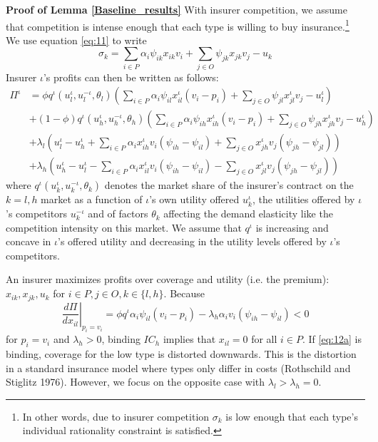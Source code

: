 \documentclass[a4paper,12pt]{article}
\makeatletter
\newcommand{\citeprocitem}[2]{\hyper@linkstart{cite}{citeproc_bib_item_#1}#2\hyper@linkend}
\makeatother
\begin{document}
\textbf{Proof of Lemma \ref{Baseline_results}}
With insurer competition, we assume that competition is intense enough that each type is willing to buy insurance.\footnote{In other words, due to insurer competition \(\sigma_k\) is low enough that each type's individual rationality constraint is satisfied.} We use equation \eqref{eq:11} to write
\begin{equation}
\label{eq:13}
\sigma_k = \sum_{i \in P} \alpha_i \psi_{ik} x_{ik} v_i + \sum_{j \in O} \psi_{jk} x_{jk} v_j - u_k
\end{equation}
Insurer \(\iota\)'s profits can then be written as follows:
\begin{align} \nonumber
\Pi^{\iota} &= \phi q^{\iota}(u_l^{\iota},u_l^{-\iota},\theta_l) (\sum_{i \in P} \alpha_i \psi_{il} x_{il}^{\iota} (v_i-p_i) + \sum_{j \in O} \psi_{jl} x_{jl}^{\iota} v_j - u_l^{\iota}) \\ \nonumber
    &+ (1-\phi) q^{\iota}(u_h^{\iota},u_h^{-\iota},\theta_h) (\sum_{i \in P} \alpha_i \psi_{ih} x_{ih}^{\iota} (v_i-p_i) + \sum_{j \in O} \psi_{jh} x_{jh}^{\iota} v_j - u_h^{\iota}) \\
    \label{eq:15}
    &+ \lambda_l (u_l^{\iota} - u_h^{\iota} + \sum_{i \in P} \alpha_i x_{ih}^{\iota} v_i (\psi_{ih}-\psi_{il}) + \sum_{j \in O} x_{jh}^{\iota} v_j (\psi_{jh}-\psi_{jl})) \\ \nonumber
    &+ \lambda_h (u_h^{\iota} - u_l^{\iota} - \sum_{i \in P} \alpha_i x_{il}^{\iota} v_i (\psi_{ih}-\psi_{il}) - \sum_{j \in O} x_{jl}^{\iota} v_j (\psi_{jh}-\psi_{jl}))
\end{align}
where \(q^{\iota}(u_k^{\iota},u_k^{-\iota},\theta_k)\) denotes the market share of the insurer's contract on the \(k=l,h\) market as a function of \(\iota\)'s own utility offered \(u_k^{\iota}\), the utilities offered by \(\iota\)'s competitors \(u_k^{-\iota}\) and of factors \(\theta_k\) affecting the demand elasticity like the competition intensity on this market. We assume that \(q^{\iota}\) is increasing and concave in \(\iota\)'s offered utility and decreasing in the utility levels offered by \(\iota\)'s competitors.

An insurer maximizes profits over coverage and utility (i.e. the premium): \(x_{ik},x_{jk},u_k\) for \(i \in P, j \in O, k \in \{l,h\}\).
Because
\begin{equation}
\label{eq:16}
\left. \frac{d\Pi}{d x_{il}}\right|_{p_i=v_i} = \phi q^{\iota} \alpha_i \psi_{il} (v_i-p_i) - \lambda_h \alpha_i v_i (\psi_{ih}-\psi_{il}) < 0
\end{equation}
for \(p_i=v_i\) and \(\lambda_h >0\), binding \(IC_h\) implies that \(x_{il} =0\) for all \(i \in P\). If \eqref{eq:12a} is binding, coverage for the low type is distorted downwards. This is the distortion in a standard insurance model where types only differ in costs (\citeprocitem{37}{Rothschild and Stiglitz 1976}). However, we focus on the opposite case with \(\lambda_l > \lambda_h = 0\).
\end{document}
